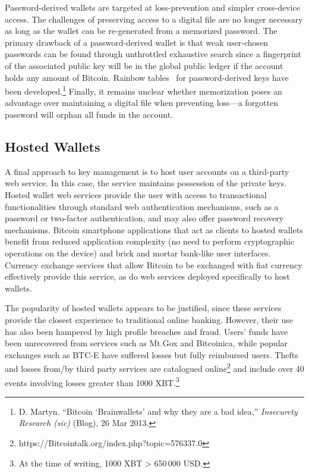 Password-derived wallets are targeted at loss-prevention and simpler cross-device access. The challenges of preserving access to a digital file are no longer necessary as long as the wallet can be re-generated from a memorized password. The primary drawback of a password-derived wallet is that weak user-chosen passwords can be found through unthrottled exhaustive search since a fingerprint of the associated public key will be in the global public ledger if the account holds any amount of Bitcoin. Rainbow tables~\cite{oechslin2003making} for password-derived keys have been developed.\footnote{D. Martyn. ``Bitcoin `Brainwallets' and why they are a bad idea,'' \textit{Insecurety Research \emph{(sic)}} (Blog), 26 Mar 2013.} Finally, it remains unclear whether memorization poses an advantage over maintaining a digital file when preventing loss---a forgotten password will orphan all funds in the account.


\subsection{Hosted Wallets} 
A final approach to key management is to host user accounts on a third-party web service. In this case, the service maintains possession of the private keys. Hosted wallet web services provide the user with access to transactional functionalities through standard web authentication mechanisms, such as a password or two-factor authentication, and may also offer password recovery mechanisms. Bitcoin smartphone applications that act as clients to hosted wallets benefit from reduced application complexity (\ie no need to perform cryptographic operations on the device) and brick and mortar bank-like user interfaces. Currency exchange services that allow Bitcoin to be exchanged with fiat currency effectively provide this service, as do web services deployed specifically to host wallets.

The popularity of hosted wallets appears to be justified, since these services provide the closest experience to traditional online banking. However, their use has also been hampered by high profile breaches and fraud. Users' funds have been unrecovered from services such as Mt.Gox and Bitcoinica, while popular exchanges such as BTC-E have suffered losses but fully reimbursed users. Thefts and losses from/by third party services are catalogued online\footnote{https://Bitcointalk.org/index.php?topic=576337.0} and include over 40 events involving losses greater than 1000 XBT.\footnote{At the time of writing, 1000 XBT > 650\,000 USD.}

